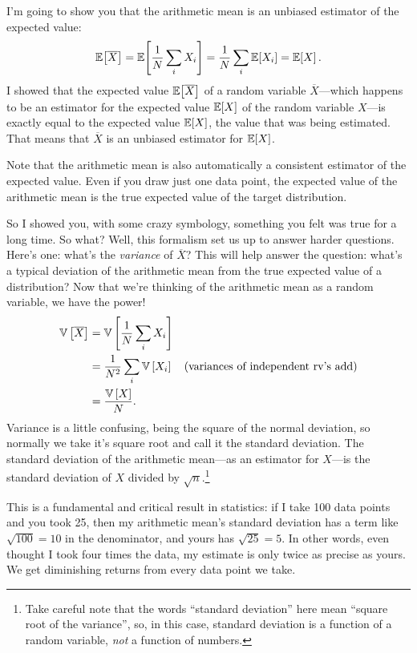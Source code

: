 I'm going to show you that the arithmetic mean is an
unbiased estimator of the expected value:
\begin{equation}
\mathbb{E}\!\left[{\overline{X}}\right] = \mathbb{E}\!\left[{\frac{1}{N} \sum_i X_i}\right] = \frac{1}{N} \sum_i \mathbb{E}\!\left[{X_i}\right] = \mathbb{E}\!\left[{X}\right].
\end{equation}
I showed that the expected value $\mathbb{E}\!\left[{\overline{X}}\right]$ of a random variable
$\overline{X}$---which happens to be an estimator for the expected value
$\mathbb{E}\!\left[{X}\right]$ of the random variable $X$---is exactly equal to the expected
value $\mathbb{E}\!\left[{X}\right]$, the value that was being estimated. That means that $\overline{X}$
is an unbiased estimator for $\mathbb{E}\!\left[{X}\right]$.

Note that the arithmetic mean is also automatically a consistent estimator of
the expected value. Even if you draw just one data point, the expected value
of the arithmetic mean is the true expected value of the target distribution.

So I showed you, with some crazy symbology, something you felt was true for a
long time. So what? Well, this formalism set us up to answer harder questions.
Here's one: what's the \emph{variance} of $\overline{X}$? This will help
answer the question: what's a typical deviation of the arithmetic mean from
the true expected value of a distribution? Now that we're thinking of the
arithmetic mean as a random variable, we have the power!
\begin{align}\label{eq:sem}
\mathbb{V}\left[{\overline{X}}\right] &= \mathbb{V}\left[{\frac{1}{N} \sum_i X_i}\right] \nonumber\\
  &= \frac{1}{N^2} \sum_i \mathbb{V}\left[{X_i}\right] \quad\text{(variances of independent rv's add)} \nonumber\\
  &= \frac{\mathbb{V}\left[{X}\right]}{N}.
\end{align}
Variance is a little confusing, being the square of the normal deviation, so
normally we take it's square root and call it the standard deviation. The
standard deviation of the arithmetic mean---as an estimator for $X$---is the
standard deviation of $X$ divided by $\sqrt{n}$.\footnote{Take careful note
that the words ``standard deviation'' here mean ``square root of the variance'',
so, in this case, standard deviation is a function of a random variable, \emph{not}
a function of numbers.}

This is a fundamental and critical result in statistics: if I take 100 data
points and you took 25, then my arithmetic mean's standard deviation has a
term like $\sqrt{100} = 10$ in the denominator, and yours has $\sqrt{25} = 5$.
In other words, even thought I took four times the data, my estimate is only
twice as precise as yours. We get diminishing returns from every data point
we take.

